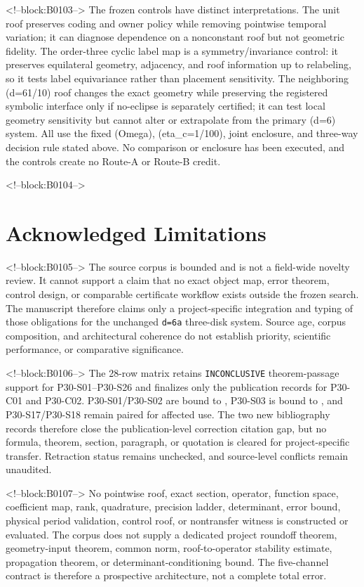 \documentclass[11pt,a4paper]{article}
\begin{document}
<!--block:B0103-->
The frozen controls have distinct interpretations.  The unit roof preserves
coding and owner policy while removing pointwise temporal variation; it can
diagnose dependence on a nonconstant roof but not geometric fidelity.  The
order-three cyclic label map is a symmetry/invariance control: it preserves
equilateral geometry, adjacency, and roof information up to relabeling, so it
tests label equivariance rather than placement sensitivity.  The neighboring
(d=61/10) roof changes the exact geometry while preserving the registered
symbolic interface only if no-eclipse is separately certified; it can test local
geometry sensitivity but cannot alter or extrapolate from the primary (d=6)
system.  All use the fixed (Omega), (eta_c=1/100), joint enclosure, and
three-way decision rule stated above.  No comparison or enclosure has been
executed, and the controls create no Route-A or Route-B credit.

<!--block:B0104-->
\section{Acknowledged Limitations}

<!--block:B0105-->
The source corpus is bounded and is not a field-wide novelty review. It cannot support a claim that no exact object map, error theorem, control design, or comparable certificate workflow exists outside the frozen search. The manuscript therefore claims only a project-specific integration and typing of those obligations for the unchanged \texttt{d=6a} three-disk system. Source age, corpus composition, and architectural coherence do not establish priority, scientific performance, or comparative significance.

<!--block:B0106-->
The 28-row matrix retains \texttt{INCONCLUSIVE} theorem-passage support for
P30-S01--P30-S26 and finalizes only the publication records for P30-C01 and
P30-C02.  P30-S01/P30-S02 are bound to \citep{P30-C01}, P30-S03 is bound to
\citep{P30-C02}, and P30-S17/P30-S18 remain paired for affected use.  The two
new bibliography records therefore close the publication-level correction
citation gap, but no formula, theorem, section, paragraph, or quotation is
cleared for project-specific transfer.  Retraction status remains unchecked,
and source-level conflicts remain unaudited.

<!--block:B0107-->
No pointwise roof, exact section, operator, function space, coefficient map, rank, quadrature, precision ladder, determinant, error bound, physical period validation, control roof, or nontransfer witness is constructed or evaluated. The corpus does not supply a dedicated project roundoff theorem, geometry-input theorem, common norm, roof-to-operator stability estimate, propagation theorem, or determinant-conditioning bound. The five-channel contract is therefore a prospective architecture, not a complete total error.
\end{document}
